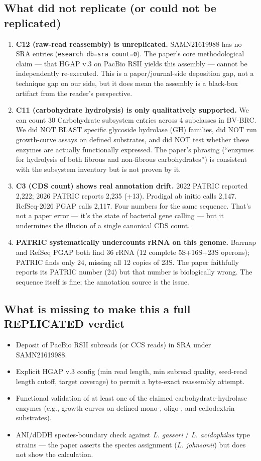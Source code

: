 \documentclass[11pt,letterpaper]{article}
\begin{document}
\subsection*{What did not replicate (or could not be replicated)}
\begin{enumerate}
\item \textbf{C12 (raw-read reassembly) is unreplicated.} SAMN21619988 has no SRA entries (\texttt{esearch db=sra count=0}). The paper's core methodological claim --- that HGAP v.3 on PacBio RSII yields this assembly --- cannot be independently re-executed. This is a paper/journal-side deposition gap, not a technique gap on our side, but it does mean the assembly is a black-box artifact from the reader's perspective.
\item \textbf{C11 (carbohydrate hydrolysis) is only qualitatively supported.} We can count 30 Carbohydrate subsystem entries across 4 subclasses in BV-BRC. We did NOT BLAST specific glycoside hydrolase (GH) families, did NOT run growth-curve assays on defined substrates, and did NOT test whether these enzymes are actually functionally expressed. The paper's phrasing (``enzymes for hydrolysis of both fibrous and non-fibrous carbohydrates'') is consistent with the subsystem inventory but is not proven by it.
\item \textbf{C3 (CDS count) shows real annotation drift.} 2022 PATRIC reported 2{,}222; 2026 PATRIC reports 2{,}235 (+13). Prodigal ab initio calls 2{,}147. RefSeq-2026 PGAP calls 2{,}117. Four numbers for the same sequence. That's not a paper error --- it's the state of bacterial gene calling --- but it undermines the illusion of a single canonical CDS count.
\item \textbf{PATRIC systematically undercounts rRNA on this genome.} Barrnap and RefSeq PGAP both find 36 rRNA (12 complete 5S+16S+23S operons); PATRIC finds only 24, missing all 12 copies of 23S. The paper faithfully reports its PATRIC number (24) but that number is biologically wrong. The sequence itself is fine; the annotation source is the issue.
\end{enumerate}

\subsection*{What is missing to make this a full REPLICATED verdict}
\begin{itemize}
\item Deposit of PacBio RSII subreads (or CCS reads) in SRA under SAMN21619988.
\item Explicit HGAP v.3 config (min read length, min subread quality, seed-read length cutoff, target coverage) to permit a byte-exact reassembly attempt.
\item Functional validation of at least one of the claimed carbohydrate-hydrolase enzymes (e.g., growth curves on defined mono-, oligo-, and cellodextrin substrates).
\item ANI/dDDH species-boundary check against \emph{L. gasseri} / \emph{L. acidophilus} type strains --- the paper asserts the species assignment (\emph{L. johnsonii}) but does not show the calculation.
\end{itemize}
\end{document}
